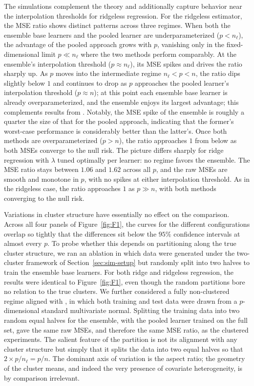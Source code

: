 \documentclass{article}
\theoremstyle{plain}
\theoremstyle{remark}
\begin{document}
The simulations complement the theory and additionally capture behavior near the interpolation thresholds for ridgeless regression. For the ridgeless estimator, the MSE ratio shows distinct patterns across three regimes. When both the ensemble base learners and the pooled learner are underparameterized ($p<n_\ell$), the advantage of the pooled approach grows with $p$, vanishing only in the fixed-dimensional limit $p\ll n_\ell$ where the two methods perform comparably. At the ensemble's interpolation threshold ($p\approx n_\ell$), its MSE spikes and drives the ratio sharply up. As $p$ moves into the intermediate regime $n_\ell<p<n$, the ratio dips slightly below $1$ and continues to drop as $p$ approaches the pooled learner's interpolation threshold ($p\approx n$); at this point each ensemble base learner is already overparameterized, and the ensemble enjoys its largest advantage; this complements results from \cite{patil2023bagging}. Notably, the MSE spike of the ensemble is roughly a quarter the size of that for the pooled approach, indicating that the former's worst-case performance is considerably better than the latter's. Once both methods are overparameterized ($p>n$), the ratio approaches $1$ from below as both MSEs converge to the null risk. The picture differs sharply for ridge regression with $\lambda$ tuned optimally per learner: no regime favors the ensemble. The MSE ratio stays between $1.06$ and $1.62$ across all $p$, and the raw MSEs are smooth and monotone in $p$, with no spikes at either interpolation threshold. As in the ridgeless case, the ratio approaches $1$ as $p\gg n$, with both methods converging to the null risk.

Variations in cluster structure have essentially no effect on the comparison. Across all four panels of Figure~\ref{fig:F1}, the curves for the different configurations overlap so tightly that the differences sit below the $95\%$ confidence intervals at almost every $p$. To probe whether this depends on partitioning along the true cluster structure, we ran an ablation in which data were generated under the two-cluster framework of Section~\ref{sec:sim-setup} but randomly split into two halves to train the ensemble base learners. For both ridge and ridgeless regression, the results were identical to Figure~\ref{fig:F1}, even though the random partitions bore no relation to the true clusters. We further considered a fully non-clustered regime aligned with \cite{patil2023bagging}, in which both training and test data were drawn from a $p$-dimensional standard multivariate normal. Splitting the training data into two random equal halves for the ensemble, with the pooled learner trained on the full set, gave the same raw MSEs, and therefore the same MSE ratio, as the clustered experiments. The salient feature of the partition is not its alignment with any cluster structure but simply that it splits the data into two equal halves so that $2\times p/n_\ell=p/n$. The dominant axis of variation is the aspect ratio; the geometry of the cluster means, and indeed the very presence of covariate heterogeneity, is by comparison irrelevant.
\end{document}
